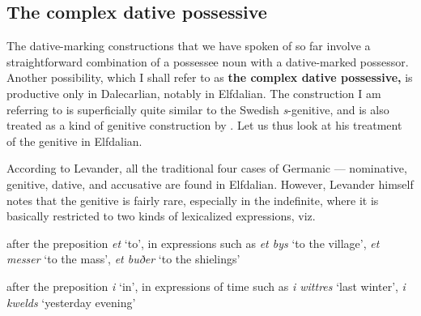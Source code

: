 \subsection{\rmfamily The complex dative possessive}
\label{bkm:Ref224373337}
\begin{styleBodyTextFirst}
The dative-marking constructions that we have spoken of so far involve a straightforward combination of a possessee noun with a dative-marked possessor. Another possibility, which I shall refer to as \textbf{the complex dative possessive,} is productive only in Dalecarlian, notably in Elfdalian. The construction I am referring to is superficially quite similar to the Swedish \textit{s}{}-genitive, and is also treated as a kind of genitive construction by \citet{Levander1909}. Let us thus look at his treatment of the genitive in Elfdalian.

\end{styleBodyTextFirst}

\begin{styleBodytextC}
According to Levander, all the traditional four cases of Germanic — nominative, genitive, dative, and accusative are found in Elfdalian. However, Levander himself notes that the genitive is fairly rare, especially in the indefinite, where it is basically restricted to two kinds of lexicalized expressions, viz. 

\end{styleBodytextC}

\begin{listWWNumixleveli}
\item 

\begin{styleListBulletiii}
after the preposition \textit{et} ‘to’, in expressions such as \textit{et bys} ‘to the village’, \textit{et messer} ‘to the mass’, \textit{et buðer} ‘to the shielings’

\end{styleListBulletiii}

\item 

\begin{styleListBulletiii}
after the preposition \textit{i} ‘in’, in expressions of time such as \textit{i wittres} ‘last winter’, \textit{i kwelds }‘yesterday evening’

\end{styleListBulletiii}

\end{listWWNumixleveli}

